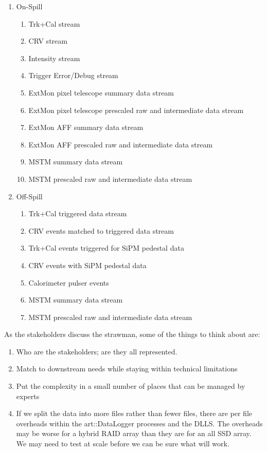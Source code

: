 
\begin{enumerate}
\item On-Spill
  \begin{enumerate}
    \item Trk+Cal stream
    \item CRV stream
    \item Intensity stream
    \item Trigger Error/Debug stream
    \item ExtMon pixel telescope summary data stream
    \item ExtMon pixel telescope prescaled raw and intermediate data stream
    \item ExtMon AFF  summary data stream
    \item ExtMon AFF prescaled raw and intermediate data stream
    \item MSTM summary data stream
    \item MSTM prescaled raw and intermediate data stream
  \end{enumerate}
%
\item Off-Spill
  \begin{enumerate}
    \item Trk+Cal triggered data stream
    \item CRV events matched to triggered data stream
    \item Trk+Cal events triggered for SiPM pedestal data
    \item CRV events with SiPM pedestal data
    \item Calorimeter pulser events
    \item MSTM summary data stream
    \item MSTM prescaled raw and intermediate data stream
  \end{enumerate}
\end{enumerate}


As the stakeholders discuss the strawman, some of the things to think about are:

\begin{enumerate}
  \item Who are the stakeholders; are they all represented.
  \item Match to downstream needs while staying within technical limitations
  \item Put the complexity in a small number of places that can be managed by experts
  \item If we split the data into more files rather than fewer files, there are per file
    overheads within the {\code art::DataLogger} processes and the DLLS.  The overheads
    may be worse for a hybrid RAID array than they are for an all SSD array.
    We may need to test at scale before we can be sure what will work.
\end{enumerate}




